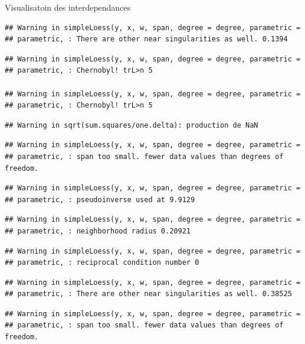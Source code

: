 \documentclass[11pt,ignorenonframetext,]{beamer}
\begin{document}
\begin{frame}[fragile]{Visualisatoin des interdependances}
\begin{verbatim}
## Warning in simpleLoess(y, x, w, span, degree = degree, parametric =
## parametric, : There are other near singularities as well. 0.1394
\end{verbatim}

\begin{verbatim}
## Warning in simpleLoess(y, x, w, span, degree = degree, parametric =
## parametric, : Chernobyl! trL>n 5

## Warning in simpleLoess(y, x, w, span, degree = degree, parametric =
## parametric, : Chernobyl! trL>n 5
\end{verbatim}

\begin{verbatim}
## Warning in sqrt(sum.squares/one.delta): production de NaN
\end{verbatim}

\begin{verbatim}
## Warning in simpleLoess(y, x, w, span, degree = degree, parametric =
## parametric, : span too small. fewer data values than degrees of freedom.
\end{verbatim}

\begin{verbatim}
## Warning in simpleLoess(y, x, w, span, degree = degree, parametric =
## parametric, : pseudoinverse used at 9.9129
\end{verbatim}

\begin{verbatim}
## Warning in simpleLoess(y, x, w, span, degree = degree, parametric =
## parametric, : neighborhood radius 0.20921
\end{verbatim}

\begin{verbatim}
## Warning in simpleLoess(y, x, w, span, degree = degree, parametric =
## parametric, : reciprocal condition number 0
\end{verbatim}

\begin{verbatim}
## Warning in simpleLoess(y, x, w, span, degree = degree, parametric =
## parametric, : There are other near singularities as well. 0.38525
\end{verbatim}

\begin{verbatim}
## Warning in simpleLoess(y, x, w, span, degree = degree, parametric =
## parametric, : span too small. fewer data values than degrees of freedom.
\end{verbatim}


\end{frame}
\end{document}
